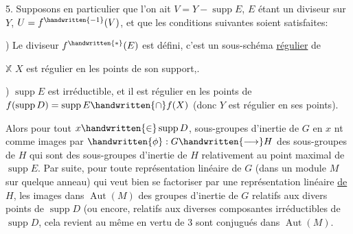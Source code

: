 5. Supposons en particulier que l'on ait $V=Y-\operatorname{supp}E$, $E$ étant un diviseur  sur $Y$,  $U=f^{\handwritten{-1}}(V)$, et que  les conditions suivantes soient satisfaites:


) Le diviseur  $f^{\handwritten{*}}(E)$ est défini, c'est un sous-schéma \uline{régulier} de


$\mathbb{X}$  $X$ est régulier en les points de son support\handwritten{)},.

) $\operatorname{supp}E$ est irréductible, et il est régulier en les points de $f(\operatorname{supp}D)=\operatorname{supp}E\handwritten{\cap}f(X)$ (donc $Y$ est régulier en ses points).

Alors pour tout $x\handwritten{\in}\operatorname{supp}D$,  sous-groupes d'inertie de $G$ en $x$ nt comme images par $\handwritten{\phi}:G\handwritten{\longrightarrow}H$ des sous-groupes de $H$ qui sont des sous-groupes d'inertie de $H$ relativement au point maximal de $\operatorname{supp}E$. Par suite, pour toute représentation linéaire de $G$ (dans un module $M$ sur quelque anneau)  qui veut bien se factoriser par une représentation linéaire \uline{de} $H$, les images dans $\operatorname{Aut}(M)$ des groupes d'inertie  de $G$ relatifs aux divers points de $\operatorname{supp}D$ (ou encore, relatifs aux diverses composantes irréductibles de $\operatorname{supp}D$, cela revient au même en vertu de 3\handwritten{)} sont conjugués dans $\operatorname{Aut}(M)$.

